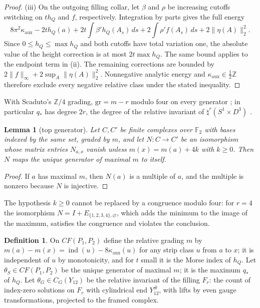 \documentclass[11pt]{amsart}
\newtheorem{lemma}[theorem]{Lemma}
\theoremstyle{definition}
\newtheorem{definition}[theorem]{Definition}
\theoremstyle{remark}
\theoremstyle{plain}
\numberwithin{equation}{section}
\newcommand{\ZZ}{\mathbb{Z}}
\newcommand{\FF}{\mathbb{F}_2}
\newcommand{\ind}{\operatorname{ind}}
\newcommand{\CF}{\mathit{CF}}
\begin{document}
\begin{proof}
(iii) On the outgoing filling collar, let $\beta$ and $\rho$
be increasing cutoffs switching on $t h_Q$ and $f$, respectively.
Integration by parts gives the full energy
\[
8\pi^2\kappa_{\mathrm{aux}}-2t h_Q(a)
 +2t\int\beta'h_Q(A_s)\,ds
 +2\int\rho'f(A_s)\,ds+2\|\eta(A)\|_2^2.
\]
Since $0\le h_Q\le\max h_Q$ and both cutoffs have total
variation one, the absolute value of the height correction is
at most $2t\max h_Q$. The same bound applies to the endpoint
term in (ii). The remaining corrections are bounded by
$2\|f\|_\infty+2\sup_A\|\eta(A)\|_2^2$.
Nonnegative analytic energy and
$\kappa_{\mathrm{aux}}\in\tfrac12\ZZ$ therefore exclude every
negative relative class under the stated inequality.
\end{proof}

With Scaduto's $\ZZ/4$ grading, $\mathrm{gr}=m-r$ modulo four on every
generator \cite[Section~7.3]{Scaduto}; in particular $q_*$ has degree $2r$, the
degree of the relative invariant of $\natural^r(S^1\times D^3)$
\cite[Sections~7.7--7.8]{Scaduto}.

\begin{lemma}[top generator]\label{lem:calibration}
Let $C,C'$ be finite complexes over $\FF$ with bases indexed by the same
set, graded by $m$, and let $N\colon C\to C'$ be an isomorphism whose
matrix entries $N_{a,x}$ vanish unless $m(x)=m(a)+4k$ with $k\ge0$.
Then $N$ maps the unique generator of maximal $m$ to itself.
\end{lemma}

\begin{proof}
If $a$ has maximal $m$, then $N(a)$ is a multiple of $a$, and the
multiple is nonzero because $N$ is injective.
\end{proof}

The hypothesis $k\ge0$ cannot be replaced by a congruence modulo four:
for $r=4$ the isomorphism $N=I+E_{\{1,2,3,4\},\varnothing}$, which adds
the minimum to the image of the maximum, satisfies the congruence and
violates the conclusion.

\begin{definition}
On $\CF(P_1,P_2)$ define the relative grading $m$ by $m(a)-m(x)=\ind(u)-
8\kappa_{\mathrm{aux}}(u)$ for any strip class $u$ from $a$ to $x$; it is independent of $u$
by monotonicity, and for $t$ small it is the Morse index of $h_Q$. Let
$\theta_S\in\CF(P_1,P_2)$ be the unique generator of maximal $m$; it is the
maximum $q_*$ of $h_Q$. Let $\theta_G\in C_G(Y_{12})$ be the relative invariant
of the filling $F_r$: the count of index-zero solutions on $F_r$ with
cylindrical end $Y_{12}^\#$, with lifts by even gauge transformations, projected to the framed
complex.
\end{definition}
\end{document}
